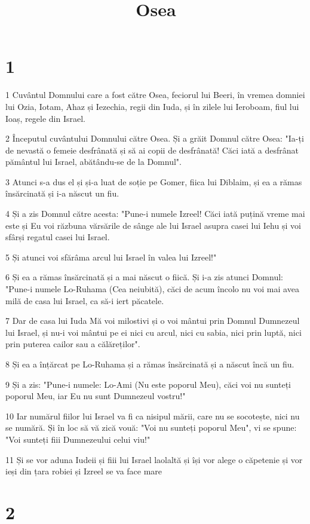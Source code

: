 

\title{Osea}


\chapter{1}

\par 1 Cuvântul Domnului care a fost către Osea, feciorul lui Beeri, în vremea domniei lui Ozia, Iotam, Ahaz și Iezechia, regii din Iuda, și în zilele lui Ieroboam, fiul lui Ioaș, regele din Israel.
\par 2 Începutul cuvântului Domnului către Osea. Și a grăit Domnul către Osea: "Ia-ți de nevastă o femeie desfrânată și să ai copii de desfrânată! Căci iată a desfrânat pământul lui Israel, abătându-se de la Domnul".
\par 3 Atunci s-a dus el și și-a luat de soție pe Gomer, fiica lui Diblaim, și ea a rămas însărcinată și i-a născut un fiu.
\par 4 Și a zis Domnul către acesta: "Pune-i numele Izreel! Căci iată puțină vreme mai este și Eu voi răzbuna vărsările de sânge ale lui Israel asupra casei lui Iehu și voi sfârși regatul casei lui Israel.
\par 5 Și atunci voi sfărâma arcul lui Israel în valea lui Izreel!"
\par 6 Și ea a rămas însărcinată și a mai născut o fiică. Și i-a zis atunci Domnul: "Pune-i numele Lo-Ruhama (Cea neiubită), căci de acum încolo nu voi mai avea milă de casa lui Israel, ca să-i iert păcatele.
\par 7 Dar de casa lui Iuda Mă voi milostivi și o voi mântui prin Domnul Dumnezeul lui Israel, și nu-i voi mântui pe ei nici cu arcul, nici cu sabia, nici prin luptă, nici prin puterea cailor sau a călăreților".
\par 8 Și ea a înțărcat pe Lo-Ruhama și a rămas însărcinată și a născut încă un fiu.
\par 9 Și a zis: "Pune-i numele: Lo-Ami (Nu este poporul Meu), căci voi nu sunteți poporul Meu, iar Eu nu sunt Dumnezeul vostru!"
\par 10 Iar numărul fiilor lui Israel va fi ca nisipul mării, care nu se socotește, nici nu se numără. Și în loc să vă zică vouă: "Voi nu sunteți poporul Meu", vi se spune: "Voi sunteți fiii Dumnezeului celui viu!"
\par 11 Și se vor aduna Iudeii și fiii lui Israel laolaltă și își vor alege o căpetenie și vor ieși din țara robiei și Izreel se va face mare

\chapter{2}

